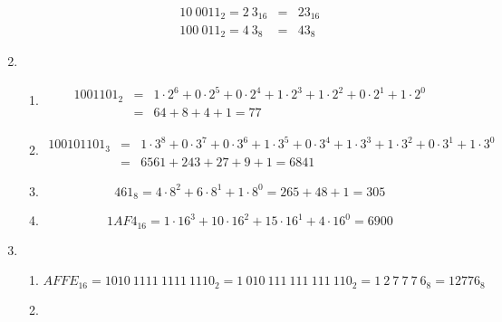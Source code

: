 \documentclass[DIN, pagenumber=false, fontsize=11pt, parskip=half]{scrartcl}
\begin{document}
\begin{enumerate}
\begin{enumerate}
\begin{eqnarray*}
                        {10\ 0011}_2 = {2\ 3}_{16} &=& {23}_{16} \\
                        {100\ 011}_2 = {4\ 3}_{8} &=& {43}_{8}
                    \end{eqnarray*}
            \end{enumerate}
        \item 
            \begin{enumerate}
                \item 
                    \begin{eqnarray*}
                        {1001101}_2 &=& 1 \cdot 2^6 + 0 \cdot 2^5 + 0 \cdot 2^4 + 1 \cdot 2^3 + 1 \cdot 2^2 + 0 \cdot 2^1 + 1 \cdot 2^0\\ 
                        &=& 64 + 8 + 4 + 1= 77
                    \end{eqnarray*}
                \item 
                    \begin{eqnarray*}
                        {100101101}_3 &=& 1 \cdot 3^8 + 0 \cdot 3^7 + 0 \cdot 3^6 + 1 \cdot 3^5 + 0 \cdot 3^4 + 1 \cdot 3^3 + 1 \cdot 3^2 + 0 \cdot 3^1 + 1 \cdot 3^0\\  
                        &=& 6561 + 243 + 27 + 9 + 1 = 6841
                    \end{eqnarray*}
                \item 
                    \begin{equation*}
                        {461}_{8} = 4 \cdot 8^2 + 6 \cdot 8^1 + 1 \cdot 8^0 = 265 + 48 + 1 = 305
                    \end{equation*}
                \item 
                    \begin{equation*}
                        {1AF4}_{16} = 1 \cdot 16^3 + 10 \cdot 16^2 + 15 \cdot 16^1 + 4 \cdot 16^0 = 6900
                    \end{equation*}
            \end{enumerate}
        \item 
            \begin{enumerate}
                \item 
                    \begin{equation*}
                        {AFFE}_{16} = {1010\ 1111\ 1111\ 1110}_2 = {1\ 010\ 111\ 111\ 111\ 110}_2 = {1\ 2\ 7\ 7\ 7\ 6}_8 = {12776}_8
                    \end{equation*}
                \item

\end{enumerate}
\end{enumerate}
\end{document}
